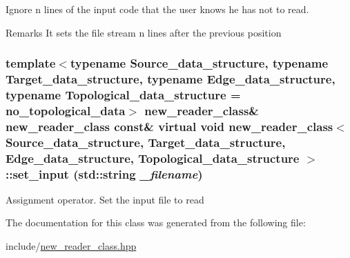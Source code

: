 Ignore n lines of the input code that the user knows he has not to read. \begin{DoxyRemark}{Remarks}
It sets the file stream n lines after the previous position 
\end{DoxyRemark}
\hypertarget{classnew__reader__class_a7436b3cd7c184da759e645e446897b12}{
\subsubsection[{set\_\-input}]{\setlength{\rightskip}{0pt plus 5cm}template$<$typename Source\_\-data\_\-structure, typename Target\_\-data\_\-structure, typename Edge\_\-data\_\-structure, typename Topological\_\-data\_\-structure = no\_\-topological\_\-data$>$ {\bf new\_\-reader\_\-class}\& {\bf new\_\-reader\_\-class} const\& virtual void {\bf new\_\-reader\_\-class}$<$ Source\_\-data\_\-structure, Target\_\-data\_\-structure, Edge\_\-data\_\-structure, Topological\_\-data\_\-structure $>$::set\_\-input (std::string {\em \_\-filename})}}
\label{classnew__reader__class_a7436b3cd7c184da759e645e446897b12}


Assignment operator. Set the input file to read 

The documentation for this class was generated from the following file:\begin{DoxyCompactItemize}
\item 
include/\hyperlink{new__reader__class_8hpp}{new\_\-reader\_\-class.hpp}\end{DoxyCompactItemize}
